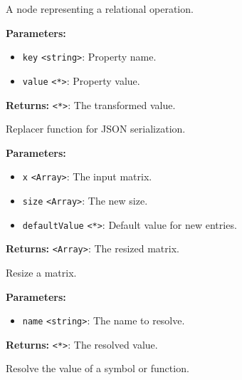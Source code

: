 \documentclass[12pt,a4paper]{article}
\begin{document}
\noindent A node representing a relational operation.

\vspace{5mm}
\noindent {}


\noindent \textbf{Parameters:}
\begin{itemize}
  \item \texttt{key} \texttt{<string>}: Property name.
  \item \texttt{value} \texttt{<*>}: Property value.
\end{itemize}

\noindent \textbf{Returns:} \texttt{<*>}: The transformed value.

\noindent Replacer function for JSON serialization.

\vspace{5mm}
\noindent {}


\noindent \textbf{Parameters:}
\begin{itemize}
  \item \texttt{x} \texttt{<Array>}: The input matrix.
  \item \texttt{size} \texttt{<Array>}: The new size.
  \item \texttt{defaultValue} \texttt{<*>}: Default value for new entries.
\end{itemize}

\noindent \textbf{Returns:} \texttt{<Array>}: The resized matrix.

\noindent Resize a matrix.

\vspace{5mm}
\noindent {}


\noindent \textbf{Parameters:}
\begin{itemize}
  \item \texttt{name} \texttt{<string>}: The name to resolve.
\end{itemize}

\noindent \textbf{Returns:} \texttt{<*>}: The resolved value.

\noindent Resolve the value of a symbol or function.
\end{document}
